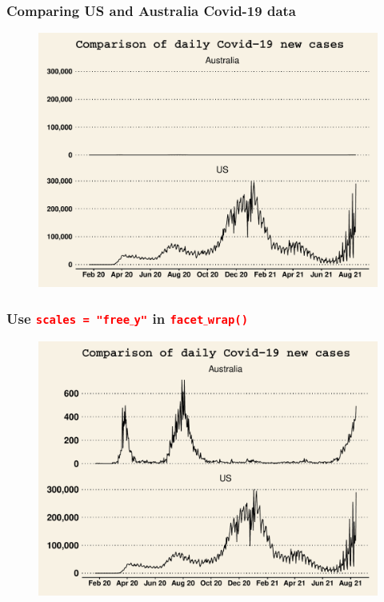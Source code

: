 \documentclass{beamer}
\begin{document}
\begin{frame}\frametitle{Comparing US and Australia Covid-19 data}
\begin{figure}
\includegraphics[width=0.99\linewidth]{PlotsLec4/Cov19USA_Ausplt}
\end{figure}
\end{frame}

\begin{frame}\frametitle{Use \texttt{\textcolor{red}{scales = "free$\_$y"}} in \texttt{\textcolor{red}{facet$\_$wrap()}}}
\begin{figure}
\includegraphics[width=0.99\linewidth]{PlotsLec4/Cov19USA_Ausplt2}
\end{figure}
\end{frame}
\end{document}
